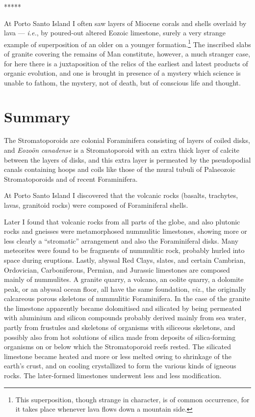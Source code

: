\documentclass[a4paper, 12pt, oneside]{article}
\begin{document}
\centerline{*\hspace{15mm}*\hspace{15mm}*\hspace{15mm}*\hspace{15mm}*}
\bigskip

At Porto Santo Island I often saw layers of Miocene corals and shells overlaid by lava --- \emph{i.e.}, by poured-out altered Eozoic limestone, surely a very strange example of superposition of an older on a younger formation.\footnote{This superposition, though strange in character, is of common occurrence, for it takes place whenever lava flows down a mountain side.} The inscribed slabs of granite covering the remains of Man constitute, however, a much stranger case, for here there is a juxtaposition of the relics of the earliest and latest products of organic evolution, and one is brought in presence of a mystery which science is unable to fathom, the mystery, not of death, but of conscious life and thought.
\clearpage
\section{Summary}
\paragraph{}
The Stromatoporoids are colonial Foraminifera consisting of layers of coiled disks, and \emph{Eozoön canadense} is a Stromatoporoid with an extra thick layer of calcite between the layers of disks, and this extra layer is permeated by the pseudopodial canals containing hoops and coils like those of the mural tubuli of Palaeozoic Stromatoporoids and of recent Foraminifera.

At Porto Santo Island I discovered that the volcanic rocks (basalts, trachytes, lavas, granitoid rocks) were composed of Foraminiferal shells.

Later I found that volcanic rocks from all parts of the globe, and also plutonic rocks and gneisses were metamorphosed nummulitic limestones, showing more or less clearly a ``stromatic'' arrangement and also the Foraminiferal disks. Many meteorites were found to be fragments of nummulitic rock, probably hurled into space during eruptions. Lastly, abyssal Red Clays, slates, and certain Cambrian, Ordovician, Carboniferous, Permian, and Jurassic limestones are composed mainly of nummulites. A granite quarry, a volcano, an oolite quarry, a dolomite peak, or an abyssal ocean floor, all have the same foundation, \emph{viz.}, the originally calcareous porous skeletons of nummulitic Foraminifera. In the case of the granite the limestone apparently became dolomitised and silicated by being permeated with aluminium and silicon compounds probably derived mainly from sea water, partly from frustules and skeletons of organisms with siliceous skeletons, and possibly also from hot solutions of silica made from deposits of silica-forming organisms on or below which the Stromatoporoid reefs rested. The silicated limestone became heated and more or less melted owing to shrinkage of the earth's crust, and on cooling crystallized to form the various kinds of igneous rocks. The later-formed limestones underwent less and less modification.
\end{document}
